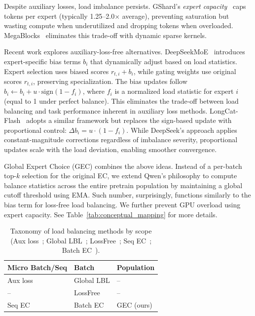 \documentclass{article}
\theoremstyle{plain}
\theoremstyle{definition}
\theoremstyle{remark}
\begin{document}
Despite auxiliary losses, load imbalance persists. GShard's \emph{expert capacity}~\cite{lepikhin2021gshard} caps tokens per expert (typically 1.25--2.0$\times$ average), preventing saturation but wasting compute when underutilized and dropping tokens when overloaded. MegaBlocks~\cite{gale2023megablocks} eliminates this trade-off with dynamic sparse kernels.

Recent work explores auxiliary-loss-free alternatives. DeepSeekMoE~\cite{dai2024deepseek} introduces expert-specific bias terms $b_i$ that dynamically adjust based on load statistics. Expert selection uses biased scores $r_{t,i} + b_i$, while gating weights use original scores $r_{t,i}$, preserving specialization. The bias updates follow $b_i \leftarrow b_i + u \cdot \text{sign}(1 - f_i)$, where $f_i$ is a normalized load statistic for expert $i$ (equal to 1 under perfect balance). This eliminates the trade-off between load balancing and task performance inherent in auxiliary loss methods. LongCat-Flash~\cite{longcat2025} adopts a similar framework but replaces the sign-based update with proportional control: $\Delta b_i = u \cdot (1 - f_i)$. While DeepSeek's approach applies constant-magnitude corrections regardless of imbalance severity, proportional updates scale with the load deviation, enabling smoother convergence. 

Global Expert Choice (GEC) combines the above ideas. Instead of a per-batch top-$k$ selection for the original EC, we extend Qwen's philosophy to compute balance statistics across the entire pretrain population by maintaining a global cutoff threshold using EMA. Such number, surprisingly, functions similarly to the bias term for loss-free load balancing. We further prevent GPU overload using expert capacity. See Table~\ref{tab:conceptual_mapping} for more details.

\begin{table}[t]
\centering
\caption{Taxonomy of load balancing methods by scope (Aux loss~\cite{lepikhin2021gshard}; Global LBL~\cite{qiu2025demonsdetailimplementingload}; LossFree~\cite{wang2024auxiliarylossfreeloadbalancingstrategy}; Seq EC~\cite{zhou2022mixture}; Batch EC~\cite{ludziejewski2024scaling}).}
\label{tab:load_balance_taxonomy}
\small
\begin{tabularx}{\columnwidth}{@{}>{\centering\arraybackslash}X>{\centering\arraybackslash}X>{\centering\arraybackslash}X@{}}
\toprule
\textbf{Micro Batch/Seq} & \textbf{Batch} & \textbf{Population} \\
\midrule
Aux loss & Global LBL & -- \\
-- & LossFree & -- \\
Seq EC & Batch EC & GEC (ours) \\
\bottomrule
\end{tabularx}
\end{table}
\end{document}
